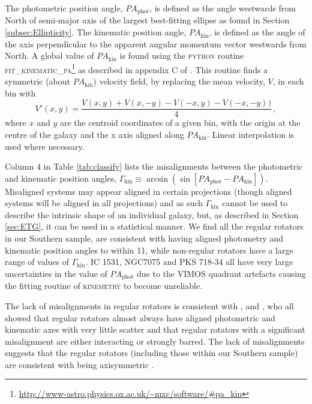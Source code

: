 			The photometric position angle, $PA_\text{phot}$, is defined as the angle westwards from North of semi-major axis of the largest best-fitting ellipse as found in Section \ref{subsec:Ellipticity}. The kinematic position angle, $PA_\text{kin}$, is defined as the angle of the axis perpendicular to the apparent angular momentum vector westwards from North. A global value of $PA_\text{kin}$ is found using the \textsc{python} routine \textsc{fit\_kinematic\_pa}\footnote{\url{http://www-astro.physics.ox.ac.uk/\~mxc/software/\#pa\_kin}} as described in appendix C of \citet{Krajnovic2006}. This routine finds a symmetric (about $PA_\text{kin}$) velocity field, by replacing the mean velocity, $V$, in each bin with
			\begin{equation}
				V'(x, y) = \frac{V(x,y) + V(x, -y) - V(-x,y) - V(-x,-y))}{4} \,,
			\end{equation}
			where $x$ and $y$ are the centroid coordinates of a given bin, with the origin at the centre of the galaxy and the x axis aligned along $PA_\text{kin}$. Linear interpolation is used where necessary.

			Column 4 in Table \ref{tab:classify} lists the misalignments between the photometric and kinematic position angles, $\Gamma_\text{kin} \equiv \arcsin(\sin[PA_\text{phot} - PA_\text{kin}])$. Misaligned systems may appear aligned in certain projections (though aligned systems will be aligned in all projections) and as such $\Gamma_\text{kin}$ cannot be used to describe the intrinsic shape of an individual galaxy, but, as described in Section \ref{sec:ETG}, it can be used in a statistical manner. We find all the regular rotators in our Southern sample, are consistent with having aligned photometry and kinematic position angles to within 11\degree, while non-regular rotators have a large range of values of $\Gamma_\text{kin}$. IC 1531, NGC7075 and PKS 718-34 all have very large uncertainties in the value of $PA_\text{phot}$ due to the VIMOS quadrant artefacts causing the fitting routine of \textsc{kinemetry} to become unreliable. 

			The lack of misalignments in regular rotators is consistent with \citet{Cappellari2007}, \citet{Krajnovic2011} and \citet{Fogarty2015}, who all showed that regular rotators almost always have aligned photometric and kinematic axes with very little scatter and that regular rotators with a significant misalignment are either interacting or strongly barred. The lack of misalignments suggests that the regular rotators (including those within our Southern sample) are consistent with being axisymmetric \citep{Cappellari2016}.

